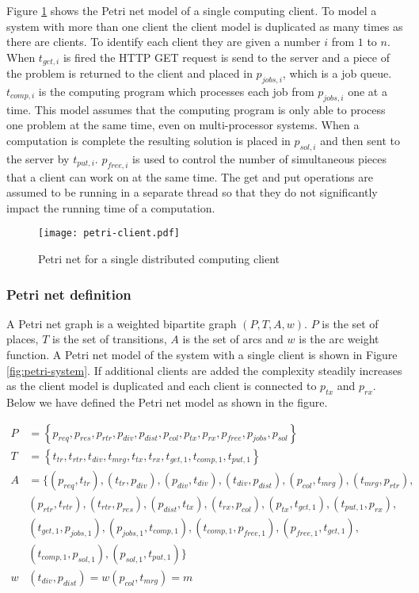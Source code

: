 Figure \ref{fig:petri-client} shows the Petri net model of a single computing client.
To model a system with more than one client the client model is duplicated as many times as there are clients.
To identify each client they are given a number $i$ from $1$ to $n$.
When $t_{get,i}$ is fired the HTTP GET request is send to the server and a piece of the problem is returned to the client and placed in $p_{jobs,i}$, which is a job queue.
$t_{comp,i}$ is the computing program which processes each job from $p_{jobs,i}$ one at a time.
This model assumes that the computing program is only able to process one problem at the same time, even on multi-processor systems.
When a computation is complete the resulting solution is placed in $p_{sol,i}$ and then sent to the server by $t_{put,i}$.
$p_{free,i}$ is used to control the number of simultaneous pieces that a client can work on at the same time.
The get and put operations are assumed to be running in a separate thread so that they do not significantly impact the running time of a computation.

\begin{figure}[tbp]
	\centering 
	\texttt{[image: petri-client.pdf]}
	\caption{Petri net for a single distributed computing client}
	\label{fig:petri-client}
\end{figure}


\subsubsection{Petri net definition}

A Petri net graph is a weighted bipartite graph $(P, T, A, w)$.
$P$ is the set of places, $T$ is the set of transitions, $A$ is the set of arcs and $w$ is the arc weight function.
A Petri net model of the system with a single client is shown in Figure \ref{fig:petri-system}.
If additional clients are added the complexity steadily increases as the client model is duplicated and each client is connected to $p_{tx}$ and $p_{rx}$.
Below we have defined the Petri net model as shown in the figure.

\begin{align*} 
P &= \left\{p_{req}, p_{res}, p_{rtr}, p_{div}, p_{dist}, p_{col}, p_{tx}, p_{rx}, p_{free}, p_{jobs}, p_{sol}\right\} \\
T &= \left\{t_{tr}, t_{rtr}, t_{div}, t_{mrg}, t_{tx}, t_{rx}, t_{get,1}, t_{comp,1}, t_{put,1}\right\} \\
A &= \{(p_{req}, t_{tr}), (t_{tr}, p_{div}), (p_{div}, t_{div}), (t_{div}, p_{dist}), (p_{col}, t_{mrg}), (t_{mrg}, p_{rtr}), \\
&(p_{rtr}, t_{rtr}), (t_{rtr}, p_{res}), (p_{dist}, t_{tx}), (t_{rx}, p_{col}), (p_{tx}, t_{get,1}), (t_{put,1}, p_{rx}), \\
&(t_{get,1}, p_{jobs,1}), (p_{jobs,1}, t_{comp,1}), (t_{comp,1}, p_{free,1}), (p_{free,1}, t_{get,1}), \\
&(t_{comp,1}, p_{sol,1}), (p_{sol,1}, t_{put,1})\} \\
w&(t_{div}, p_{dist}) = w(p_{col}, t_{mrg}) = m \\
\end{align*}

